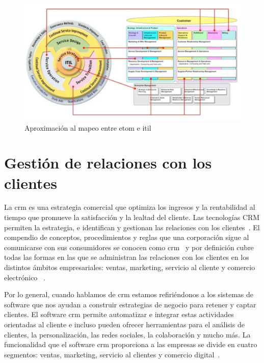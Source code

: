 \begin{figure}
  \centering
  \includegraphics[width=\textwidth]{imaxes/etom-itil.png}
  \caption{Aproximación al mapeo entre \acrshort{etom} e \acrshort{itil}~\cite{Itil-eTom}}
  \label{fig:itil-etom}
\end{figure}


\section{Gestión de relaciones con los clientes}


La \acrfull{crm} es una estrategia comercial que optimiza los ingresos y la rentabilidad al tiempo que promueve la satisfacción y la lealtad del cliente. Las tecnologías CRM permiten la estrategia, e identifican y gestionan las relaciones con los clientes~\cite{GartnerCRM}. El compendio de conceptos, procedimientos y reglas que una corporación sigue al comunicarse con sus consumidores se conocen como  \acrshort{crm}~\cite{WikiCRM} y por definición cubre todas las formas en las que se administran las relaciones con los clientes en los distintos ámbitos empresariales: ventas, marketing, servicio al cliente y comercio electrónico~\cite{SAP-CRM} . 

Por lo general, cuando hablamos de \acrshort{crm} estamos refiriéndonos a los sistemas de software que nos ayudan a construir estrategias de negocio para retener y captar clientes.
El software \acrfull{crm} permite automatizar e integrar estas actividades orientadas al cliente e incluso pueden ofrecer herramientas para el análisis de clientes, la personalización, las redes sociales, la colaboración y mucho más. La funcionalidad que el software \acrshort{crm} proporciona a las empresas se divide en cuatro segmentos: ventas, marketing, servicio al clientes y comercio digital~\cite{GartnerCRM}. 


